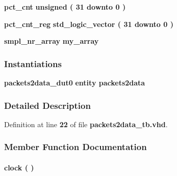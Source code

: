 \begin{DoxyCompactItemize}
{\bf pct\+\_\+cnt} {\bfseries \textcolor{comment}{unsigned}\textcolor{vhdlchar}{ }\textcolor{vhdlchar}{(}\textcolor{vhdlchar}{ }\textcolor{vhdlchar}{ } \textcolor{vhdldigit}{31} \textcolor{vhdlchar}{ }\textcolor{keywordflow}{downto}\textcolor{vhdlchar}{ }\textcolor{vhdlchar}{ } \textcolor{vhdldigit}{0} \textcolor{vhdlchar}{ }\textcolor{vhdlchar}{)}\textcolor{vhdlchar}{ }} 
\item 
{\bf pct\+\_\+cnt\+\_\+reg} {\bfseries \textcolor{comment}{std\+\_\+logic\+\_\+vector}\textcolor{vhdlchar}{ }\textcolor{vhdlchar}{(}\textcolor{vhdlchar}{ }\textcolor{vhdlchar}{ } \textcolor{vhdldigit}{31} \textcolor{vhdlchar}{ }\textcolor{keywordflow}{downto}\textcolor{vhdlchar}{ }\textcolor{vhdlchar}{ } \textcolor{vhdldigit}{0} \textcolor{vhdlchar}{ }\textcolor{vhdlchar}{)}\textcolor{vhdlchar}{ }} 
\item 
{\bf smpl\+\_\+nr\+\_\+array} {\bfseries {\bfseries {\bf my\+\_\+array}} \textcolor{vhdlchar}{ }} 
\end{DoxyCompactItemize}
\subsubsection*{Instantiations}
 \begin{DoxyCompactItemize}
\item 
{\bf packets2data\+\_\+dut0}  {\bfseries entity packets2data}   
\end{DoxyCompactItemize}


\subsubsection{Detailed Description}


Definition at line {\bf 22} of file {\bf packets2data\+\_\+tb.\+vhd}.



\subsubsection{Member Function Documentation}
\paragraph[{clock}]{\setlength{\rightskip}{0pt plus 5cm} {\bfseries \textcolor{vhdlchar}{ }} clock ( ) \hspace{0.3cm}{\ttfamily [Process]}}\label{classpackets2data__tb_1_1tb__behave_af761a67e9d7ce9e23381088b6f2ae893}


